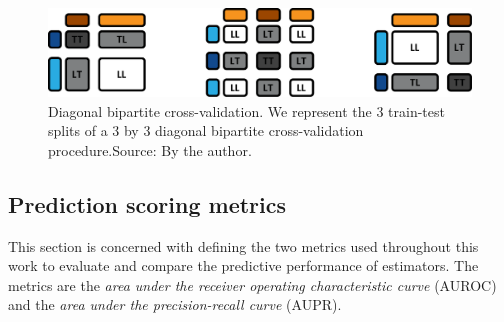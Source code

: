 \begin{figure}[tb]
    \centering
    \includegraphics[width=\textwidth]{figures/diagonal_cv.pdf}
    \caption{Diagonal bipartite cross-validation. We represent the 3 train-test splits of a 3 by 3 diagonal bipartite cross-validation procedure.\newline Source: By the author.}
    \label{fig:bipartite diagonal cv}
\end{figure}



\subsection{Prediction scoring metrics}
\label{sec:prediction_metrics}


This section is concerned with defining the two metrics used throughout this work to evaluate and compare the predictive performance of estimators. The metrics are the \emph{area under the receiver operating characteristic curve} (AUROC) and the \emph{area under the precision-recall curve} (AUPR).

